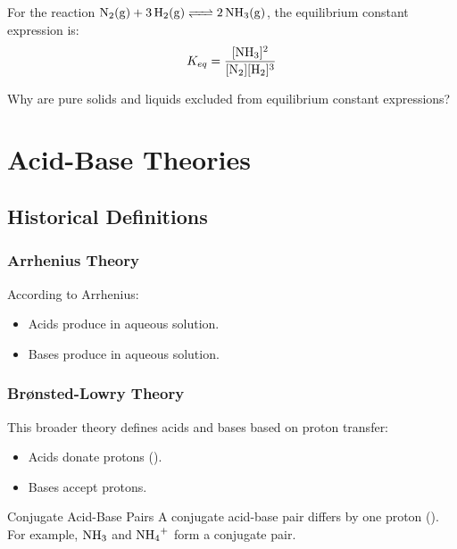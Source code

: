 
\begin{example}
For the reaction \(\ce{N2(g) + 3H2(g) <=> 2NH3(g)}\), the equilibrium constant expression is:
\[
K_{eq} = \frac{[\ce{NH3}]^2}{[\ce{N2}][\ce{H2}]^3}
\]
\end{example}

\begin{stopandthink}
Why are pure solids and liquids excluded from equilibrium constant expressions?
\end{stopandthink}

\section{Acid-Base Theories}

\subsection{Historical Definitions}

\subsubsection{Arrhenius Theory}
 According to Arrhenius:
\begin{itemize}
\item Acids produce  in aqueous solution.
\item Bases produce  in aqueous solution.
\end{itemize}

\subsubsection{Brønsted-Lowry Theory}
This broader theory defines acids and bases based on proton transfer:
\begin{itemize}
\item Acids donate protons ().
\item Bases accept protons.
\end{itemize}

\begin{keyconcept}{Conjugate Acid-Base Pairs}
A conjugate acid-base pair differs by one proton (). For example, \(\ce{NH3}\) and \(\ce{NH4+}\) form a conjugate pair.
\end{keyconcept}

